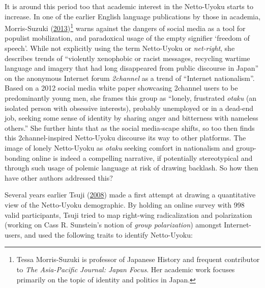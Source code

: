 \documentclass[10pt,british,A4paper,,openany]{memoir}
\begin{document}
It is around this period too that academic interest in the Netto-Uyoku
starts to increase. In one of the earlier English language publications
by those in academia, Morris-Suzuki
(\protect\hyperlink{ref-morris-suzuki_freedom_2013}{2013})\footnote{Tessa
  Morris-Suzuki is professor of Japanese History and frequent
  contributor to \emph{The Asia-Pacific Journal: Japan Focus}. Her
  academic work focuses primarily on the topic of identity and politics
  in Japan.} warns against the dangers of social media as a tool for
populist mobilization, and paradoxical usage of the empty signifier
`freedom of speech'. While not explicitly using the term Netto-Uyoku or
\emph{net-right}, she describes trends of ``violently xenophobic or
racist messages, recycling wartime language and imagery that had long
disappeared from public discourse in Japan'' on the anonymous Internet
forum \emph{2channel} as a trend of ``Internet nationalism''. Based on a
2012 social media white paper showcasing 2channel users to be
predominantly young men, she frames this group as ``lonely, frustrated
\emph{otaku} (an isolated person with obsessive interests), probably
unemployed or in a dead-end job, seeking some sense of identity by
sharing anger and bitterness with nameless others.'' She further hints
that as the social media-scape shifts, so too then finds this
2channel-inspired Netto-Uyoku discourse its way to other platforms. The
image of lonely Netto-Uyoku as \emph{otaku} seeking comfort in
nationalism and group-bonding online is indeed a compelling narrative,
if potentially stereotypical and through such usage of polemic language
at risk of drawing backlash. So how then have other authors addressed
this?

Several years earlier Tsuji
(\protect\hyperlink{ref-tsuji_eng:_2008}{2008}) made a first attempt at
drawing a quantitative view of the Netto-Uyoku demographic. By holding
an online survey with 998 valid participants, Tsuji tried to map
right-wing radicalization and polarization (working on Cass R.
Sunstein's notion of \emph{group polarization}) amongst Internet-users,
and used the following traits to identify Netto-Uyoku:
\end{document}

